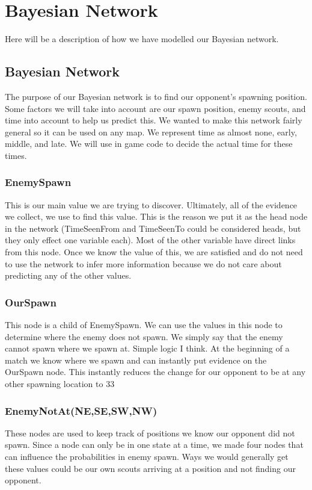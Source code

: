 \section{Bayesian Network}\label{bayesian_network}

Here will be a description of how we have modelled our Bayesian network.

\subsection{Bayesian Network}			 
			
The purpose of our Bayesian network is to find our opponent's spawning position. Some factors we will take into account are our spawn position, enemy scouts, and time into account to help us predict this. We wanted to make this network fairly general so it can be used on any  map. We represent time as almost none, early, middle, and late. We will use in game code to decide the actual time for these times.

\subsubsection*{EnemySpawn}
This is our main value we are trying to discover. Ultimately, all of the evidence we collect, we use to find this value. This is the reason we put it as the head node in the network (TimeSeenFrom and TimeSeenTo could be considered heads, but they only effect one variable each). Most of the other variable have direct links from this node. Once we know the value of this, we are satisfied and do not need to use the network to infer more information because we do not care about predicting any of the other values.

\subsubsection*{OurSpawn}
This node is a child of EnemySpawn. We can use the values in this node to determine where the enemy does not spawn. We simply say that the enemy cannot spawn where we spawn at. Simple logic I think. At the beginning of a match we know where we spawn and can instantly put evidence on the OurSpawn node. This instantly reduces the change for our opponent to be at any other spawning location to 33%

\subsubsection*{EnemyNotAt(NE,SE,SW,NW)}
These nodes are used to keep track of positions we know our opponent did not spawn. Since a node can only be in one state at a time, we made four nodes that can influence the probabilities in enemy spawn. Ways we would generally get these values could be our own scouts arriving at a position and not finding our opponent.

